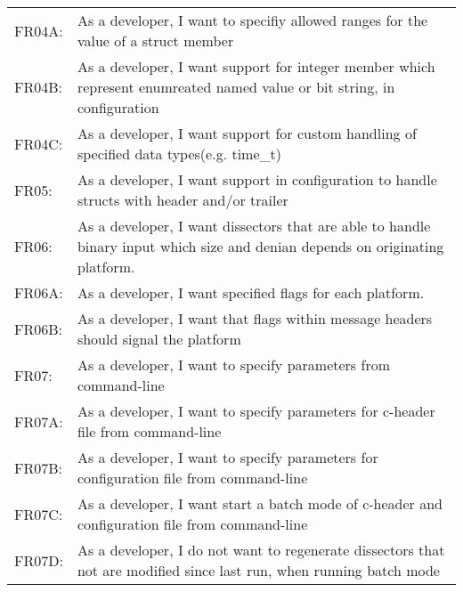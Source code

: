 \begin{tabular}{l p{10cm}}
FR04A: 	&As a developer, I want to specifiy allowed ranges for the value of a struct member\\
FR04B:	&As a developer, I want support for integer member which represent enumreated named value or bit string, in configuration\\
FR04C:	&As a developer, I want support for custom handling of specified data types(e.g. time\_t)\\
\hline
FR05:		&As a developer, I want support in configuration to handle structs with header and/or trailer\\
\hline
FR06:		&As a developer, I want dissectors that are able to handle binary input which size and denian depends on originating platform.\\
FR06A:	&As a developer, I want specified flags for each platform.\\
FR06B:	&As a developer, I want that flags within message headers should signal the platform\\
\hline
FR07:		&As a developer, I want to specify parameters from command-line\\
FR07A:	&As a developer, I want to specify parameters for c-header file from command-line\\
FR07B:	&As a developer, I want to specify parameters for configuration file from command-line\\
FR07C:	&As a developer, I want start a batch mode of c-header and configuration file from command-line\\
FR07D:	&As a developer, I do not want to regenerate dissectors that not are modified since last run, when running batch mode\\
\hline
\end{tabular}
